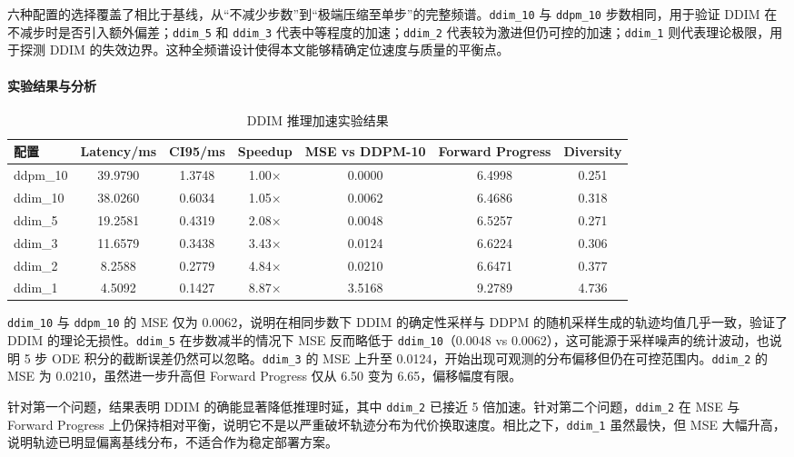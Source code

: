 六种配置的选择覆盖了相比于基线，从``不减少步数''到``极端压缩至单步''的完整频谱。\texttt{ddim\_10} 与 \texttt{ddpm\_10} 步数相同，用于验证 DDIM 在不减步时是否引入额外偏差；\texttt{ddim\_5} 和 \texttt{ddim\_3} 代表中等程度的加速；\texttt{ddim\_2} 代表较为激进但仍可控的加速；\texttt{ddim\_1} 则代表理论极限，用于探测 DDIM 的失效边界。这种全频谱设计使得本文能够精确定位速度与质量的平衡点。

\paragraph*{实验结果与分析}

\begin{table}[htbp]
    \centering
    \caption{DDIM 推理加速实验结果}
    \label{tab:ddim-results}
    \begin{tabular}{lcccccc}
        \toprule
        配置 & Latency/ms & CI95/ms & Speedup & MSE vs DDPM-10 & Forward Progress & Diversity \\
        \midrule
        ddpm\_10 & 39.9790 & 1.3748 & 1.00$\times$ & 0.0000 & 6.4998 & 0.251 \\
        ddim\_10 & 38.0260 & 0.6034 & 1.05$\times$ & 0.0062 & 6.4686 & 0.318 \\
        ddim\_5 & 19.2581 & 0.4319 & 2.08$\times$ & 0.0048 & 6.5257 & 0.271 \\
        ddim\_3 & 11.6579 & 0.3438 & 3.43$\times$ & 0.0124 & 6.6224 & 0.306 \\
        ddim\_2 & 8.2588 & 0.2779 & 4.84$\times$ & 0.0210 & 6.6471 & 0.377 \\
        ddim\_1 & 4.5092 & 0.1427 & 8.87$\times$ & 3.5168 & 9.2789 & 4.736 \\
        \bottomrule
    \end{tabular}
\end{table}

\texttt{ddim\_10} 与 \texttt{ddpm\_10} 的 MSE 仅为 0.0062，说明在相同步数下 DDIM 的确定性采样与 DDPM 的随机采样生成的轨迹均值几乎一致，验证了 DDIM 的理论无损性。\texttt{ddim\_5} 在步数减半的情况下 MSE 反而略低于 \texttt{ddim\_10}（0.0048 vs 0.0062），这可能源于采样噪声的统计波动，也说明 5 步 ODE 积分的截断误差仍然可以忽略。\texttt{ddim\_3} 的 MSE 上升至 0.0124，开始出现可观测的分布偏移但仍在可控范围内。\texttt{ddim\_2} 的 MSE 为 0.0210，虽然进一步升高但 Forward Progress 仅从 6.50 变为 6.65，偏移幅度有限。

针对第一个问题，结果表明 DDIM 的确能显著降低推理时延，其中 \texttt{ddim\_2} 已接近 5 倍加速。针对第二个问题，\texttt{ddim\_2} 在 MSE 与 Forward Progress 上仍保持相对平衡，说明它不是以严重破坏轨迹分布为代价换取速度。相比之下，\texttt{ddim\_1} 虽然最快，但 MSE 大幅升高，说明轨迹已明显偏离基线分布，不适合作为稳定部署方案。

